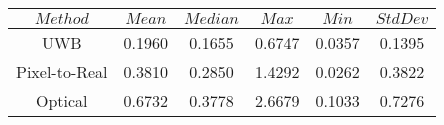 \begin{table}[h]
\centering
\begin{tabular}{|c|c|c|c|c|c|}
\hline
$Method$ & $Mean$ & $Median$ & $Max$ & $Min$ & $StdDev$ \\
\hline
UWB & 0.1960 & 0.1655 & 0.6747 & 0.0357 & 0.1395 \\
\hline
Pixel-to-Real & 0.3810 & 0.2850 & 1.4292 & 0.0262 & 0.3822 \\
\hline
Optical & 0.6732 & 0.3778 & 2.6679 & 0.1033 & 0.7276 \\
\hline
\end{tabular}
\end{table}
